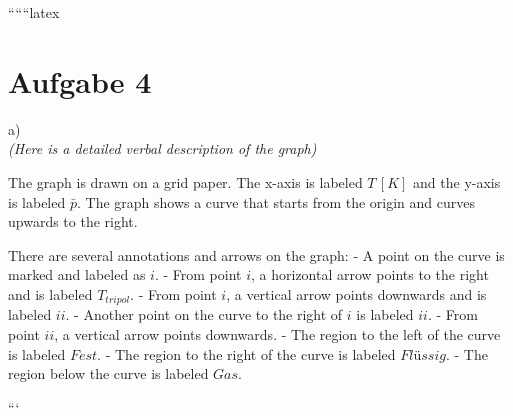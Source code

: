 
``````latex


\section*{Aufgabe 4}

a) \\
\textit{(Here is a detailed verbal description of the graph)}

The graph is drawn on a grid paper. The x-axis is labeled $T \, [K]$ and the y-axis is labeled $\bar{p}$. The graph shows a curve that starts from the origin and curves upwards to the right. 

There are several annotations and arrows on the graph:
- A point on the curve is marked and labeled as $i$.
- From point $i$, a horizontal arrow points to the right and is labeled $T_{tripol}$.
- From point $i$, a vertical arrow points downwards and is labeled $ii$.
- Another point on the curve to the right of $i$ is labeled $ii$.
- From point $ii$, a vertical arrow points downwards.
- The region to the left of the curve is labeled $Fest$.
- The region to the right of the curve is labeled $Flüssig$.
- The region below the curve is labeled $Gas$.

```